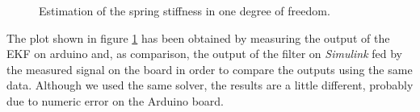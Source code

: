 \begin{figure}[!tbh]
  \centering
  \hfill
  \caption{Estimation of the spring stiffness in one degree of freedom.}
    \label{fig:ekfsimard}
\end{figure}

The plot shown in figure \ref{fig:ekfsimard} has been obtained by measuring the output of the EKF on arduino and, as comparison, the output of the filter on \emph{Simulink} fed by the measured signal on the board in order to compare the outputs using the same data. Although we used the same solver, the results are a little different, probably due to numeric error on the Arduino board.\\